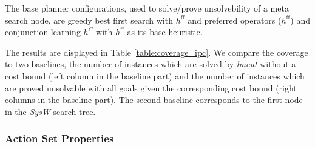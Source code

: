 The base planner configurations, used to solve/prove unsolvebility of a meta search node,
are greedy best first search with $h^{\text{ff}}$ and preferred operators ($h^{\text{ff}}$) and  
conjunction learning $h^C$ with $h^{\text{ff}}$ as its base heuristic. 

The results are displayed in Table \ref{table:coverage_ipc}.
We compare the coverage to two baselines, the number of instances which are solved by \emph{lmcut} without
a cost bound (left column in the baseline part) and the number of instances which are proved
unsolvable with all goals given the corresponding cost bound (right columns in the baseline part). 
The second baseline corresponds to the first node in the \emph{SysW} search tree.



\setlength{\tabcolsep}{2pt}
\renewcommand{\arraystretch}{0.8}
\begin{figure*}[ht]
	\centering  
	\caption{
		Benchmark: oversubscription IPC
		domains with bound $ = x \cdot $ optimal cost with $
		x \in \{0.25, 0.5, 0.75\}$, solvable with lmcut with no cost bound in 
		30 min and with less then 31 goal facts(limitation of implementation).
	}
	\label{table:coverage_ipc}
\end{figure*}



\subsubsection*{Action Set Properties}

\begin{figure*}[ht]
%
\caption{nomystery: reference coverage first node in top-down meta search tree;
	optimal coverage always 10}
\end{figure*}

\begin{figure*}[ht]
%
\caption{TPP: reference coverage first node in top-down meta search tree;
	optimal coverage always 10}
\end{figure*}

\begin{figure*}[ht]
%
\caption{rovers: reference optimal coverage; coverage first node in top down meta search
	tree always 10}
\end{figure*}

\begin{figure*}[ht]
%
\caption{blocksworld}
\end{figure*}
